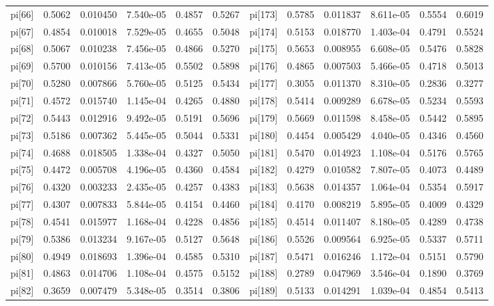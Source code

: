 \documentclass[12pt]{article}
\begin{document}
\begin{table}[h!]
\begin{tabular}{|llllll|llllll|}
pi[66] & 0.5062 & 0.010450   & 7.540e-05 & 0.4857 &0.5267 &pi[173] & 0.5785 & 0.011837  & 8.611e-05 & 0.5554 &0.6019 \\
pi[67] & 0.4854 & 0.010018   & 7.529e-05 & 0.4655 &0.5048 &pi[174] & 0.5153 & 0.018770  & 1.403e-04 & 0.4791 &0.5524 \\
pi[68] & 0.5067 & 0.010238   & 7.456e-05 & 0.4866 &0.5270 &pi[175] & 0.5653 & 0.008955  & 6.608e-05 & 0.5476 &0.5828 \\
pi[69] & 0.5700 & 0.010156   & 7.413e-05 & 0.5502 &0.5898 &pi[176] & 0.4865 & 0.007503  & 5.466e-05 & 0.4718 &0.5013 \\
pi[70] & 0.5280 & 0.007866   & 5.760e-05 & 0.5125 &0.5434 &pi[177] & 0.3055 & 0.011370  & 8.310e-05 & 0.2836 &0.3277 \\
pi[71] & 0.4572 & 0.015740   & 1.145e-04 & 0.4265 &0.4880 &pi[178] & 0.5414 & 0.009289 & 6.678e-05 & 0.5234 &0.5593 \\
pi[72] & 0.5443 & 0.012916   & 9.492e-05 & 0.5191 &0.5696 &pi[179] & 0.5669 & 0.011598  & 8.458e-05 & 0.5442 &0.5895 \\
pi[73] & 0.5186 & 0.007362   & 5.445e-05 & 0.5044 &0.5331 &pi[180] & 0.4454 & 0.005429  & 4.040e-05 & 0.4346 &0.4560 \\
pi[74] & 0.4688 & 0.018505   & 1.338e-04 & 0.4327 &0.5050 &pi[181] & 0.5470 & 0.014923  & 1.108e-04 & 0.5176 &0.5765 \\
pi[75] & 0.4472 & 0.005708   & 4.196e-05 & 0.4360 &0.4584 &pi[182] & 0.4279 & 0.010582  & 7.807e-05 & 0.4073 &0.4489 \\
pi[76] & 0.4320 & 0.003233   & 2.435e-05 & 0.4257 &0.4383 &pi[183] & 0.5638 & 0.014357  & 1.064e-04 & 0.5354 &0.5917 \\
pi[77] & 0.4307 & 0.007833   & 5.844e-05 & 0.4154 &0.4460 &pi[184] & 0.4170 & 0.008219  & 5.895e-05 & 0.4009 &0.4329 \\
pi[78] & 0.4541 & 0.015977   & 1.168e-04 & 0.4228 &0.4856 &pi[185] & 0.4514 & 0.011407  & 8.180e-05 & 0.4289 &0.4738 \\
pi[79] & 0.5386 & 0.013234   & 9.167e-05 & 0.5127 &0.5648 &pi[186] & 0.5526 & 0.009564 & 6.925e-05 & 0.5337 &0.5711 \\
pi[80] & 0.4949 & 0.018693   & 1.396e-04 & 0.4585 &0.5310 &pi[187] & 0.5471 & 0.016246  & 1.172e-04 & 0.5151 &0.5790\\
pi[81]  & 0.4863 & 0.014706  & 1.108e-04 & 0.4575 &0.5152 &pi[188] & 0.2789 & 0.047969  & 3.546e-04 & 0.1890 &0.3769 \\
pi[82]  & 0.3659 & 0.007479  & 5.348e-05 & 0.3514 &0.3806 &pi[189] & 0.5133 & 0.014291  & 1.039e-04 & 0.4854 &0.5413 \\

\end{tabular}
\end{table}
\end{document}
